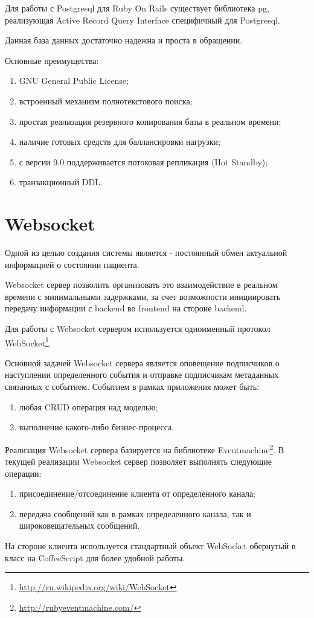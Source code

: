 Для работы с Postgresql для Ruby On Rails существует библиотека pg, реализующая
Active Record Query Interface специфичный для Postgresql.

Данная база данных достаточно надежна и проста в обращении.

Основные преимущества:
\begin{enumerate}
  \item GNU General Public License;
  \item встроенный механизм полнотекстового поиска;
  \item простая реализация резервного копирования базы в реальном времени;
  \item наличие готовых средств для баллансировки нагрузки;
  \item с версии 9.0 поддерживается потоковая репликация (Hot Standby);
  \item транзакционный DDL.
\end{enumerate}

\section{Websocket}
Одной из целью создания системы является - постоянный обмен актуальной
информацией о состоянии пациента.
	
Websocket сервер позволить организовать это взаимодействие в реальном времени с
минимальными задержками, за счет возможности инициировать передачу информации с
backend во frontend на стороне backend.
	
Для работы с Websocket сервером используется одноименный протокол WebSocket\footnote{
	\url{http://ru.wikipedia.org/wiki/WebSocket}
}.

Основной задачей Websocket сервера является оповещение подписчиков о наступлении
определенного события и отправке подписчикам метаданных связанных с событием.
Событием в рамках приложения может быть:
\begin{enumerate}
  \item любая CRUD операция над моделью;
  \item выполнение какого-либо бизнес-процесса.
\end{enumerate}

Реализация Websocket сервера базируется на библиотеке Eventmachine\footnote{
	\url{http://rubyeventmachine.com/}
}. В текущей реализации Websocket сервер позволяет выполнять следующие операции:
\begin{enumerate}
  \item присоединение/отсоединение клиента от определенного канала;
  \item передача сообщений как в рамках определенного канала, так и
широковещательных сообщений.
\end{enumerate}

На стороне клиента используется стандартный объект WebSocket обернутый в класс
на CoffeeScript для более удобной работы.
